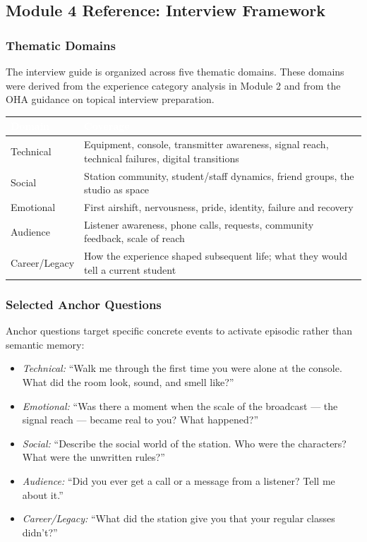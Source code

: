 \documentclass[11pt,letterpaper]{article}
\newcommand{\tableheader}[1]{\textbf{\sffamily\textcolor{white}{#1}}}
\begin{document}
\subsection{Module 4 Reference: Interview Framework}

\subsubsection{Thematic Domains}

The interview guide is organized across five thematic domains. These domains were derived from the experience category analysis in Module 2 and from the OHA guidance on topical interview preparation.

\begin{center}
\begin{tabularx}{\textwidth}{L{3cm}X}
\toprule
{}
\tableheader{Domain} & \tableheader{Coverage} \\
\midrule
Technical & Equipment, console, transmitter awareness, signal reach, technical failures, digital transitions \\
Social & Station community, student/staff dynamics, friend groups, the studio as space \\
Emotional & First airshift, nervousness, pride, identity, failure and recovery \\
Audience & Listener awareness, phone calls, requests, community feedback, scale of reach \\
Career/Legacy & How the experience shaped subsequent life; what they would tell a current student \\
\bottomrule
\end{tabularx}
\end{center}

\subsubsection{Selected Anchor Questions}

Anchor questions target specific concrete events to activate episodic rather than semantic memory:

\begin{itemize}
  \item \textit{Technical:} ``Walk me through the first time you were alone at the console. What did the room look, sound, and smell like?''
  \item \textit{Emotional:} ``Was there a moment when the scale of the broadcast --- the signal reach --- became real to you? What happened?''
  \item \textit{Social:} ``Describe the social world of the station. Who were the characters? What were the unwritten rules?''
  \item \textit{Audience:} ``Did you ever get a call or a message from a listener? Tell me about it.''
  \item \textit{Career/Legacy:} ``What did the station give you that your regular classes didn't?''
\end{itemize}
\end{document}
